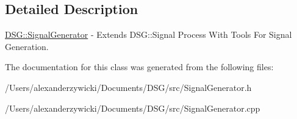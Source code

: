 \subsection{Detailed Description}
\hyperlink{class_d_s_g_1_1_signal_generator}{D\+S\+G\+::\+Signal\+Generator} -\/ Extends D\+S\+G\+::\+Signal Process With Tools For Signal Generation. 

The documentation for this class was generated from the following files\+:\begin{DoxyCompactItemize}
\item 
/\+Users/alexanderzywicki/\+Documents/\+D\+S\+G/src/Signal\+Generator.\+h\item 
/\+Users/alexanderzywicki/\+Documents/\+D\+S\+G/src/Signal\+Generator.\+cpp\end{DoxyCompactItemize}
